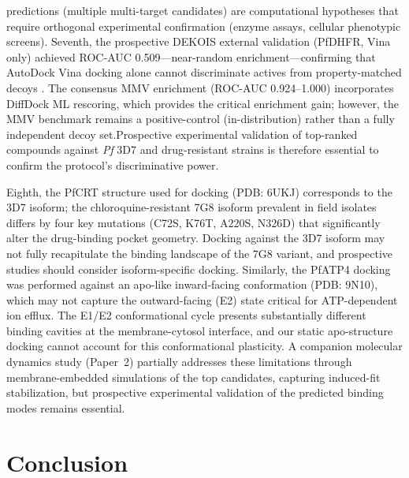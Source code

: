 \documentclass[journal=jcisd8,manuscript=article]{achemso}
\begin{document}
predictions (multiple multi-target candidates) are computational hypotheses that require orthogonal experimental confirmation (enzyme assays, cellular phenotypic screens). Seventh, the prospective DEKOIS external validation (PfDHFR, Vina only) achieved ROC-AUC \num{0.509}---near-random enrichment---confirming that AutoDock Vina docking alone cannot discriminate actives from property-matched decoys \cite{Bauer2013}. The consensus MMV enrichment (ROC-AUC \numrange{0.924}{1.000}) incorporates DiffDock ML rescoring, which provides the critical enrichment gain; however, the MMV benchmark remains a positive-control (in-distribution) rather than a fully independent decoy set.Prospective experimental validation of top-ranked compounds against \textit{Pf} 3D7 and drug-resistant strains is therefore essential to confirm the protocol's discriminative power.

Eighth, the PfCRT structure used for docking (PDB: 6UKJ) corresponds to the 3D7 isoform; the chloroquine-resistant 7G8 isoform prevalent in field isolates differs by four key mutations (C72S, K76T, A220S, N326D) that significantly alter the drug-binding pocket geometry. Docking against the 3D7 isoform may not fully recapitulate the binding landscape of the 7G8 variant, and prospective studies should consider isoform-specific docking. Similarly, the PfATP4 docking was performed against an apo-like inward-facing conformation (PDB: 9N10), which may not capture the outward-facing (E2) state critical for ATP-dependent ion efflux. The E1/E2 conformational cycle presents substantially different binding cavities at the membrane-cytosol interface, and our static apo-structure docking cannot account for this conformational plasticity. A companion molecular dynamics study (Paper~2) partially addresses these limitations through membrane-embedded simulations of the top candidates, capturing induced-fit stabilization, but prospective experimental validation of the predicted binding modes remains essential.

\section{Conclusion}
\end{document}
